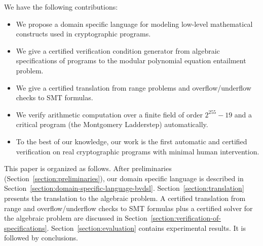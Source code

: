 We have the following contributions:
\begin{itemize}
\item We propose a domain specific language \bvdsl for modeling low-level
  mathematical constructs used in cryptographic programs.
\item We give a certified verification condition generator from
  algebraic specifications of programs to the modular polynomial
  equation entailment problem.
\item We give a certified translation from range problems and overflow/underflow checks to SMT formulas.
\item We verify arithmetic computation over a finite field of order
  $2^{255} - 19$ and a
  critical program (the Montgomery Ladderstep) automatically.
\item To the best of our knowledge, our work is the first automatic
  and certified verification on real cryptographic programs with
  minimal human intervention.
\end{itemize}




This paper is organized as follows. After preliminaries
(Section~\ref{section:preliminaries}), our domain specific
language is described in Section~\ref{section:domain-specific-language-bvdsl}.
Section~\ref{section:translation}
presents the translation to the algebraic
problem. A certified translation from range and overflow/underflow checks to SMT formulas plus a certified solver for the algebraic problem are discussed in Section~\ref{section:verification-of-specifications}.
Section~\ref{section:evaluation} contains experimental results. It is
followed by conclusions.

